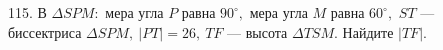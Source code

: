 115. В $\Delta SPM:$ мера угла $P$ равна $90^\circ,$ мера угла $M$ равна $60^\circ,$ $ST$ --- биссектриса $\Delta SPM,\ |PT|=26,\ TF$ --- высота $\Delta TSM.$ Найдите $|TF|.$\\
